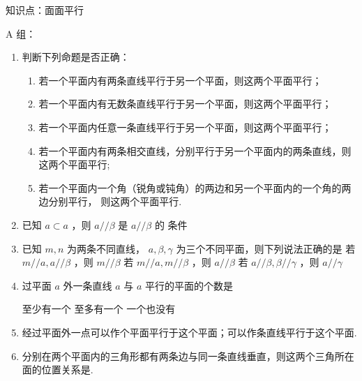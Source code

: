 知识点：面面平行

A 组：
\begin{enumerate}

\item 判断下列命题是否正确：

    \begin{enumerate}
        \item 若一个平面内有两条直线平行于另一个平面，则这两个平面平行；

        \item 若一个平面内有无数条直线平行于另一个平面，则这两个平面平行； 

        \item 若一个平面内任意一条直线平行于另一个平面，则这两个平面平行； 

        \item 若一个平面内有两条相交直线，分别平行于另一个平面内的两条直线，则这两个平面平行; 

        \item 若一个平面内一个角（锐角或钝角）的两边和另一个平面内的一个角的两边分别平行， 则这两个平面平行. 

        
    \end{enumerate}

    \item 已知 $ a \subset  a $ ，则 $ a//\beta $ 是 $ a//\beta $ 的 条件

    \item 已知 $ m,n $ 为两条不同直线， $ a,\beta ,\gamma $ 为三个不同平面，则下列说法正确的是
     {若 $ m//a,a//\beta $ ，则 $ m//\beta $}
    {若 $ m//a,m//\beta $ ，则 $ a//\beta $} {若 $ a//\beta ,\beta //\gamma $ ，则 $ a//\gamma $}

    \item 过平面 $ a $ 外一条直线 $ a $ 与 $ a $ 平行的平面的个数是 

     {至少有一个} {至多有一个} { 一个也没有}

    \item 经过平面外一点可以作个平面平行于这个平面；可以作条直线平行于这个平面.
    
    \item 分别在两个平面内的三角形都有两条边与同一条直线垂直，则这两个三角所在面的位置关系是.

\end{enumerate}


